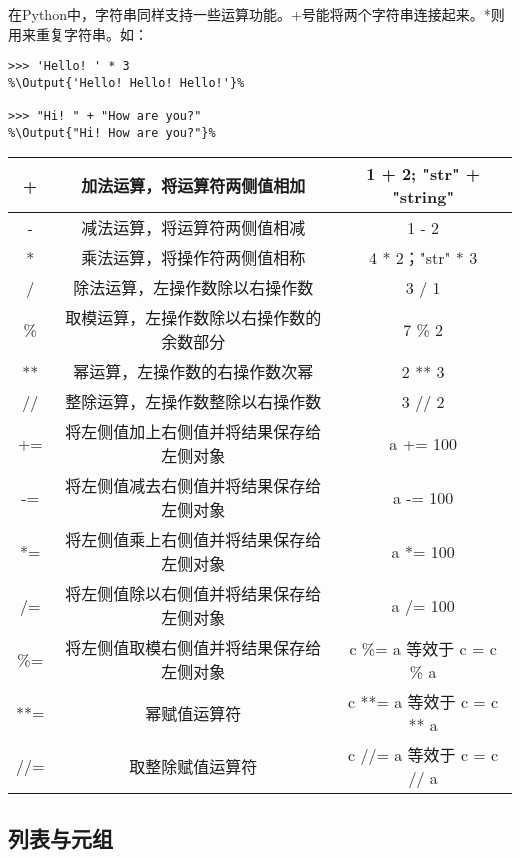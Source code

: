 在Python中，字符串同样支持一些运算功能。+号能将两个字符串连接起来。*则用来重复字符串。如：

\begin{lstlisting}
>>> 'Hello! ' * 3
%\Output{'Hello! Hello! Hello!'}%

>>> "Hi! " + "How are you?"
%\Output{"Hi! How are you?"}%

\end{lstlisting}

\begin{center}
    \tabletail{\hline}
    \tablelasttail{\hline}
    \begin{supertabular}{|c|c|c|}
        \hline
        + & 加法运算，将运算符两侧值相加 & 1 + 2; "str" + "string" \\
        \hline
        - & 减法运算，将运算符两侧值相减 & 1 - 2\\
        \hline
        * & 乘法运算，将操作符两侧值相称 & 4 * 2；"str" * 3\\
        \hline
        / & 除法运算，左操作数除以右操作数 & 3 / 1\\
        \hline
        \% & 取模运算，左操作数除以右操作数的余数部分 & 7 \% 2\\
        \hline
        ** & 幂运算，左操作数的右操作数次幂 & 2 ** 3\\
        \hline
        // & 整除运算，左操作数整除以右操作数& 3 // 2\\
        \hline
        += & 将左侧值加上右侧值并将结果保存给左侧对象 & a += 100\\
        \hline
        -= & 将左侧值减去右侧值并将结果保存给左侧对象 & a -= 100\\
        \hline
        *= & 将左侧值乘上右侧值并将结果保存给左侧对象 & a *= 100\\
        \hline
        /= & 将左侧值除以右侧值并将结果保存给左侧对象 & a /= 100\\
        \hline
        \%= & 将左侧值取模右侧值并将结果保存给左侧对象 & c \%= a 等效于 c = c \% a\\
        \hline
        **=	& 幂赋值运算符 & c **= a 等效于 c = c ** a\\
        \hline
        //=	& 取整除赋值运算符 & c //= a 等效于 c = c // a\\
        \hline
    \end{supertabular}
\end{center}

\subsection{列表与元组}

